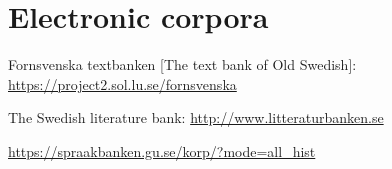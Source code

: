 \documentclass[output=paper]{langscibook}
\begin{document}
\section*{Electronic corpora}
\begin{description}[font=\normalfont]
\item[FTB:] Fornsvenska textbanken [The text bank of Old Swedish]:  \url{https://project2.sol.lu.se/fornsvenska} 
\item[LB:] The Swedish literature bank: \url{http://www.litteraturbanken.se}
\item[Korp:] \url{https://spraakbanken.gu.se/korp/?mode=all_hist}
\end{description}

{\sloppy\printbibliography[heading=subbibliography,notkeyword=this]}
\end{document}
